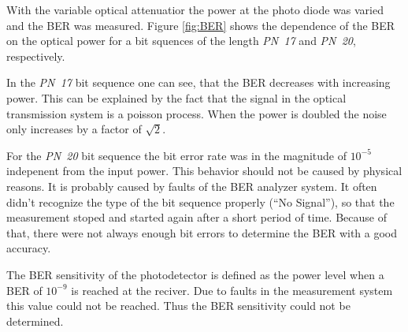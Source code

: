 With the variable optical attenuatior the power at the photo diode was varied and the BER was measured. Figure \ref{fig:BER} shows the dependence of the BER on the optical power for a bit squences of the length \textit{PN~17} and \textit{PN~20}, respectively.
 
In the \textit{PN~17} bit sequence one can see, that the BER decreases with increasing power. This can be explained by the fact that the signal in the optical transmission system is a poisson process. When the power is doubled the noise only increases by a factor of $\sqrt{2}$.

For the \textit{PN~20} bit sequence the bit error rate was in the magnitude of $10^{-5}$ indepenent from the input power. This behavior should not be caused by physical reasons. It is probably caused by faults of the BER analyzer system. It often didn't recognize the type of the bit sequence properly (``No Signal''), so that the measurement stoped and started again after a short period of time. Because of that, there were not always enough bit errors to determine the BER with a good accuracy.

The BER sensitivity of the photodetector is defined as the power level when a BER of $10^{-9}$ is reached at the reciver. Due to faults in the measurement system this value could not be reached. Thus the BER sensitivity could not be determined.
